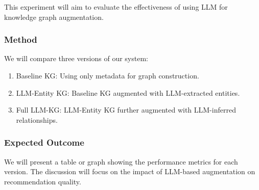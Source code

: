\documentclass{article}
\begin{document}
This experiment will aim to evaluate the effectiveness of using LLM for knowledge graph augmentation.

\subsubsection{Method}
We will compare three versions of our system:
\begin{enumerate}
    \item Baseline KG: Using only metadata for graph construction.
    \item LLM-Entity KG: Baseline KG augmented with LLM-extracted entities.
    \item Full LLM-KG: LLM-Entity KG further augmented with LLM-inferred relationships.
\end{enumerate}

\subsubsection{Expected Outcome}
We will present a table or graph showing the performance metrics for each version. The discussion will focus on the impact of LLM-based augmentation on recommendation quality.




\end{document}
